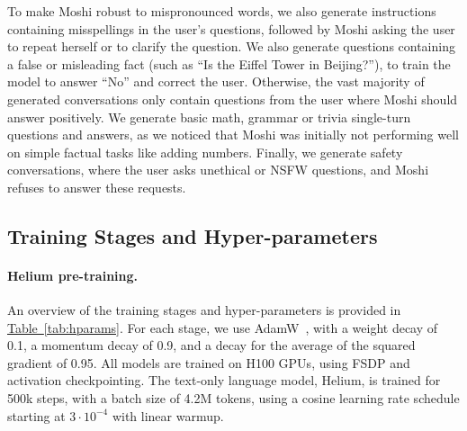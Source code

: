 To make Moshi robust to mispronounced words, we also generate instructions containing misspellings in the user’s questions, followed by Moshi asking the user to repeat herself or to clarify the question.
We also generate questions containing a false or misleading fact (such as “Is the Eiffel Tower in Beijing?”), to train the model to answer “No” and correct the user.
Otherwise, the vast majority of generated conversations only contain questions from the user where Moshi should answer positively.
We generate basic math, grammar or trivia single-turn questions and answers, as we noticed that Moshi was initially not performing well on simple factual tasks like adding numbers.
Finally, we generate safety conversations, where the user asks unethical or NSFW questions, and Moshi refuses to answer these requests.

\subsection{Training Stages and Hyper-parameters}
\label{sec:stages}
\paragraph{Helium pre-training.}
An overview of the training stages and hyper-parameters is provided in \hyperref[tab:hparams]{Table~\ref{tab:hparams}}.
For each stage, we use AdamW~\citep{adamw}, with a weight decay of 0.1, a momentum decay of 0.9, and a decay for the average of the squared gradient of 0.95. All models are trained on H100 GPUs, using FSDP and activation checkpointing. The text-only language model, Helium, is trained for 500k steps, with a batch size of 4.2M tokens, using a cosine learning rate schedule starting at $3\cdot 10^{-4}$ with linear warmup.

